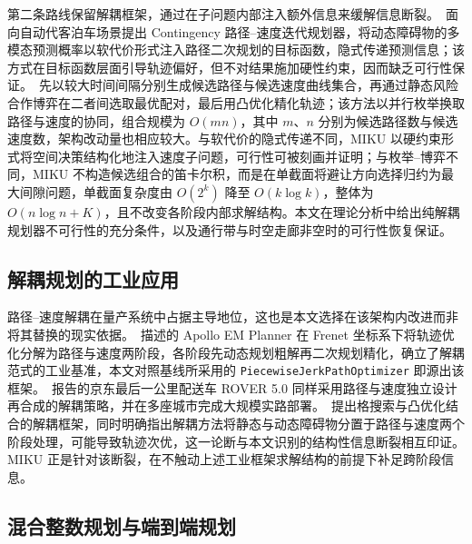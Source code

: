 \documentclass[a4paper,11pt]{ctexart}
\theoremstyle{definition}
\begin{document}
第二条路线保留解耦框架，通过在子问题内部注入额外信息来缓解信息断裂。\citet{han2026_contingency}~面向自动代客泊车场景提出 Contingency 路径--速度迭代规划器，将动态障碍物的多模态预测概率以软代价形式注入路径二次规划的目标函数，隐式传递预测信息；该方式在目标函数层面引导轨迹偏好，但不对结果施加硬性约束，因而缺乏可行性保证。\citet{zhang2023_dp_rcg}~先以较大时间间隔分别生成候选路径与候选速度曲线集合，再通过静态风险合作博弈在二者间选取最优配对，最后用凸优化精化轨迹；该方法以并行枚举换取路径与速度的协同，组合规模为 $O(mn)$，其中 $m$、$n$ 分别为候选路径数与候选速度数，架构改动量也相应较大。与软代价的隐式传递不同，MIKU 以硬约束形式将空间决策结构化地注入速度子问题，可行性可被刻画并证明；与枚举--博弈不同，MIKU 不构造候选组合的笛卡尔积，而是在单截面将避让方向选择归约为最大间隙问题，单截面复杂度由 $O(2^k)$ 降至 $O(k\log k)$，整体为 $O(n\log n + K)$，且不改变各阶段内部求解结构。本文在理论分析中给出纯解耦规划器不可行性的充分条件，以及通行带与时空走廊非空时的可行性恢复保证。

\subsection{解耦规划的工业应用}
\label{sec:related-industrial}

路径--速度解耦在量产系统中占据主导地位，这也是本文选择在该架构内改进而非将其替换的现实依据。\citet{fan2018baidu}~描述的 Apollo EM Planner 在 Frenet 坐标系下将轨迹优化分解为路径与速度两阶段，各阶段先动态规划粗解再二次规划精化，确立了解耦范式的工业基准，本文对照基线所采用的 \texttt{PiecewiseJerkPathOptimizer} 即源出该框架。\citet{wang2022_jfr}~报告的京东最后一公里配送车 ROVER 5.0 同样采用路径与速度独立设计再合成的解耦策略，并在多座城市完成大规模实路部署。\citet{meng2019_access}~提出格搜索与凸优化结合的解耦框架，同时明确指出解耦方法将静态与动态障碍物分置于路径与速度两个阶段处理，可能导致轨迹次优，这一论断与本文识别的结构性信息断裂相互印证。MIKU 正是针对该断裂，在不触动上述工业框架求解结构的前提下补足跨阶段信息。

\subsection{混合整数规划与端到端规划}
\label{sec:related-supplement}
\end{document}
